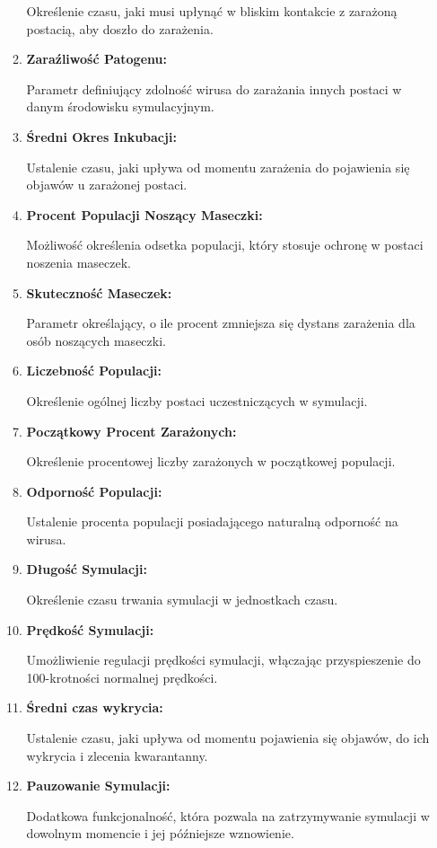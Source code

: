 \begin{itemize}
\begin{enumerate}
		Określenie czasu, jaki musi upłynąć w bliskim kontakcie z zarażoną postacią, aby doszło do zarażenia.
		\item \textbf{Zaraźliwość Patogenu:}
		
		Parametr definiujący zdolność wirusa do zarażania innych postaci w danym środowisku symulacyjnym.
		\item \textbf{Średni Okres Inkubacji:}
		
		Ustalenie czasu, jaki upływa od momentu zarażenia do pojawienia się objawów u zarażonej postaci.
		\item \textbf{Procent Populacji Noszący Maseczki:}
		
		Możliwość określenia odsetka populacji, który stosuje ochronę w postaci noszenia maseczek.
		\item \textbf{Skuteczność Maseczek:}
		
		Parametr określający, o ile procent zmniejsza się dystans zarażenia dla osób noszących maseczki.
		\item \textbf{Liczebność Populacji:}
		
		Określenie ogólnej liczby postaci uczestniczących w symulacji.
		
		\item \textbf{Początkowy Procent Zarażonych:}
		
		Określenie procentowej liczby zarażonych w początkowej populacji.
		\item \textbf{Odporność Populacji:}
		
		Ustalenie procenta populacji posiadającego naturalną odporność na wirusa.
		\item \textbf{Długość Symulacji:}
		
		Określenie czasu trwania symulacji w jednostkach czasu.
		\item \textbf{Prędkość Symulacji:}
		
		Umożliwienie regulacji prędkości symulacji, włączając przyspieszenie do 100-krotności normalnej prędkości.
		
		\item \textbf{Średni czas wykrycia:}
		
		Ustalenie czasu, jaki upływa od momentu pojawienia się objawów, do ich wykrycia i zlecenia kwarantanny.
		\item \textbf{Pauzowanie Symulacji:}
		
		Dodatkowa funkcjonalność, która pozwala na zatrzymywanie symulacji w dowolnym momencie i jej późniejsze wznowienie.
	\end{enumerate}
\end{itemize}
